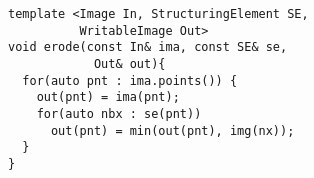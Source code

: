 \documentclass[varwidth=8cm, border={0.1cm 0.1cm 0.1cm 0.1cm}]{standalone}
\begin{document}
\begin{verbatim}
template <Image In, StructuringElement SE,
          WritableImage Out>
void erode(const In& ima, const SE& se,
            Out& out){
  for(auto pnt : ima.points()) {
    out(pnt) = ima(pnt);
    for(auto nbx : se(pnt))
      out(pnt) = min(out(pnt), img(nx));
  }
}
\end{verbatim}
\end{document}

